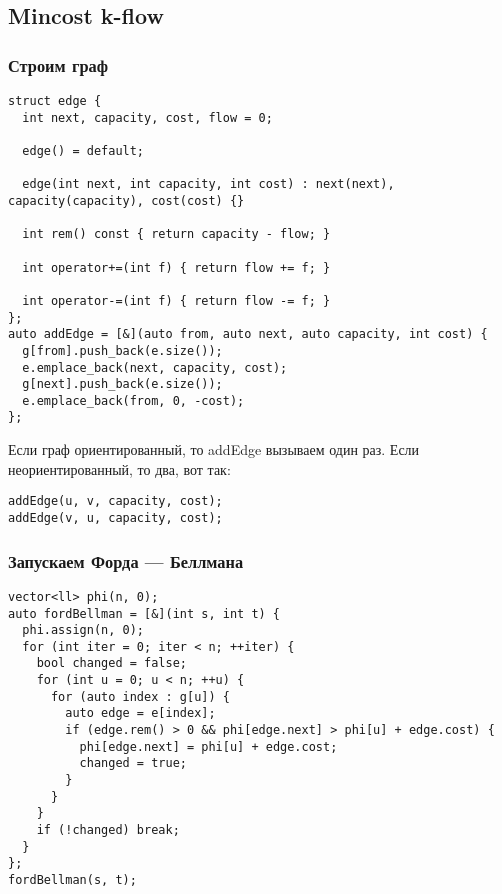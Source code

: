 \subsection{Mincost k-flow}
\subsubsection{Строим граф}
\begin{lstlisting}
struct edge {
  int next, capacity, cost, flow = 0;

  edge() = default;

  edge(int next, int capacity, int cost) : next(next), capacity(capacity), cost(cost) {}

  int rem() const { return capacity - flow; }

  int operator+=(int f) { return flow += f; }

  int operator-=(int f) { return flow -= f; }
};
auto addEdge = [&](auto from, auto next, auto capacity, int cost) {
  g[from].push_back(e.size());
  e.emplace_back(next, capacity, cost);
  g[next].push_back(e.size());
  e.emplace_back(from, 0, -cost);
};
\end{lstlisting}
Если граф ориентированный, то addEdge вызываем один раз.
Если неориентированный, то два, вот так:
\begin{lstlisting}
addEdge(u, v, capacity, cost);
addEdge(v, u, capacity, cost);
\end{lstlisting}
\subsubsection{Запускаем Форда --- Беллмана}
\begin{lstlisting}
vector<ll> phi(n, 0);
auto fordBellman = [&](int s, int t) {
  phi.assign(n, 0);
  for (int iter = 0; iter < n; ++iter) {
    bool changed = false;
    for (int u = 0; u < n; ++u) {
      for (auto index : g[u]) {
        auto edge = e[index];
        if (edge.rem() > 0 && phi[edge.next] > phi[u] + edge.cost) {
          phi[edge.next] = phi[u] + edge.cost;
          changed = true;
        }
      }
    }
    if (!changed) break;
  }
};
fordBellman(s, t);
\end{lstlisting}

